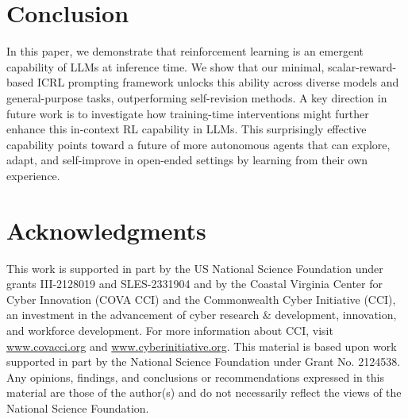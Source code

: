\documentclass{article}
\newcommand{\0}{\mathbf{0}}
\begin{document}
\section{Conclusion}
In this paper, we demonstrate that reinforcement learning is an emergent capability of LLMs at inference time. We show that our minimal, scalar-reward-based ICRL prompting framework unlocks this ability across diverse models and general-purpose tasks, outperforming self-revision methods. A key direction in future work is to investigate how training-time interventions might further enhance this in-context RL capability in LLMs. This surprisingly effective capability points toward a future of more autonomous agents that can explore, adapt, and self-improve in open-ended settings by learning from their own experience.
\section*{Acknowledgments}
This work is supported in part by the US National Science Foundation under grants III-2128019 and SLES-2331904 and by the Coastal Virginia Center for Cyber Innovation (COVA CCI) and the Commonwealth Cyber Initiative (CCI),
an investment in the advancement of cyber research $\text{\&}$ development, innovation, and workforce development. For more information about CCI, visit
\url{www.covacci.org} and \url{www.cyberinitiative.org}.
This material is based upon work supported in part by the National Science Foundation under Grant No. 2124538. Any opinions, findings, and conclusions or recommendations expressed in this material are those of the author(s) and do not necessarily reflect the views of the National Science Foundation.


\appendix
\end{document}
